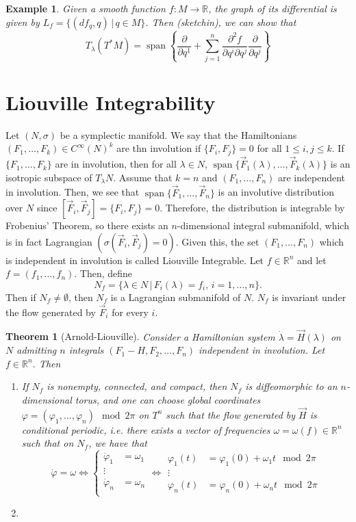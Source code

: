 \documentclass{article}
\newcommand{\R}{\mathbb R}
\newcommand{\nl}{\newline\newline\noindent}
\newcommand{\vhi}{\varphi}
\newcommand{\w}{\omega}
\newcommand{\pd}[1]{\frac{\partial}{\partial #1}}
\DeclareMathOperator{\spn}{span}
\newtheorem{thm}{Theorem}
\newtheorem{ex}{Example}
\begin{document}
\begin{ex}
    Given a smooth function $f:M\to \R$, the graph of its differential is given by $L_f = \{(df_q,q)\,|\, q\in M\}$. Then (sketchin), we can show that
    \[T_\lambda(T^*M) = \spn\left\{\pd{q^1} + \sum_{j=1}^n \frac{\partial^2 f}{\partial q^i\partial q^j }\pd{q^j}\right\}\]
\end{ex}
\section{Liouville Integrability}
Let $(N,\sigma)$ be a symplectic manifold. We say that the Hamiltonians $(F_1,\dots,F_k)\in C^\infty(N)^k$  are thn involution if $\{F_i,F_j\} = 0$ for all $1\leq i,j\leq k$. If $\{F_1,\dots, F_k\}$ are in involution, then for all $\lambda \in N$, $\spn\{\vec F_1(\lambda),\dots,\vec F_k(\lambda)\}$ is an isotropic subspace of $T_\lambda N$.
\nl
Assume that $k=n$ and $(F_1,\dots,F_n)$ are independent in involution. Then, we see that $\spn\{\vec F_1,\dots,\vec F_n\}$  is an involutive distribution over $N$ since $[\vec F_i, \vec F_j] = \{F_i,F_j\} = 0$. Therefore, the distribution is integrable by Frobenius' Theorem, so there exists an $n$-dimensional integral submanifold, which is in fact Lagrangian $(\sigma(\vec F_i,\vec F_j) = 0)$. Given this, the set $(F_1,\dots,F_n)$ which is independent in involution is called Liouville Integrable. Let $f\in \R^n$ and let $f = (f_1,\dots,f_n)$. Then, define
\[N_f = \{\lambda\in N\,|\,F_i(\lambda) = f_i,\,i=1,\dots,n\}.\]
Then if $N_f\neq \emptyset$, then $N_f$ is a Lagrangian submanifold of $N$. $N_f$ is invariant under the flow generated by $\vec F_i$ for every $i$.
\nl
\begin{thm}[Arnold-Liouville]
    Consider a Hamiltonian system $\dot\lambda = \vec H(\lambda)$ on $N$ admitting $n$ integrals $(F_1 - H, F_2,\dots,F_n)$ independent in involution. Let $f\in \R^n$. Then
    \begin{enumerate}
        \item If $N_f$ is nonempty, connected, and compact, then $N_f$ is diffeomorphic to an $n$-dimensional torus, and one can choose global coordinates $\vhi = (\vhi_1,\dots,\vhi_n) \mod 2\pi$ on $T^n$ such that the flow generated by $\vec H$ is conditional periodic, i.e. there exists a vector of frequencies $\w = \w(f)\in \R^n$ such that on $N_f$, we have that
        \[\dot\vhi=\w\Leftrightarrow\left\{\begin{aligned}
            \dot\vhi_1&=\w_1\\
            \vdots\\
            \dot\vhi_n&=\w_n\\
        \end{aligned}\right.\Leftrightarrow\begin{aligned}
            \vhi_1(t) & = \vhi_1(0) +\w_1 t \mod 2\pi\\
            \vdots\\
            \vhi_n(t) & = \vhi_n(0) +\w_n t \mod 2\pi
        \end{aligned}\]
        \item 
    \end{enumerate}
\end{thm}
\end{document}
